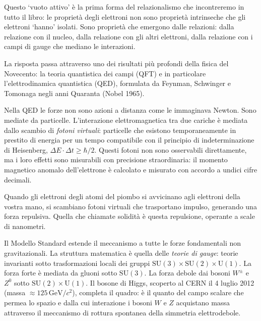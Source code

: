 \documentclass[12pt,a4paper,openany]{book}
\newcommand{\sezione}[1]{\vspace{1.2em}{\large\bfseries #1}\vspace{0.5em}\par}
\begin{document}
Questo `vuoto attivo' è la prima forma del relazionalismo che incontreremo in tutto il libro: le proprietà degli elettroni non sono proprietà intrinseche che gli elettroni `hanno' isolati. Sono proprietà che emergono dalle relazioni: dalla relazione con il nucleo, dalla relazione con gli altri elettroni, dalla relazione con i campi di gauge che mediano le interazioni.

\sezione{Il meccanismo della solidità: forze di gauge e fotoni virtuali}

La risposta passa attraverso uno dei risultati più profondi della fisica del Novecento: la teoria quantistica dei campi (QFT) e in particolare l'elettrodinamica quantistica (QED), formulata da Feynman, Schwinger e Tomonaga negli anni Quaranta (Nobel 1965).

Nella QED le forze non sono azioni a distanza come le immaginava Newton. Sono mediate da particelle. L'interazione elettromagnetica tra due cariche è mediata dallo scambio di \textit{fotoni virtuali}: particelle che esistono temporaneamente in prestito di energia per un tempo compatibile con il principio di indeterminazione di Heisenberg, $\Delta E \cdot \Delta t \geq \hbar/2$. Questi fotoni non sono osservabili direttamente, ma i loro effetti sono misurabili con precisione straordinaria: il momento magnetico anomalo dell'elettrone è calcolato e misurato con accordo a undici cifre decimali.

Quando gli elettroni degli atomi del piombo si avvicinano agli elettroni della vostra mano, si scambiano fotoni virtuali che trasportano impulso, generando una forza repulsiva. Quella che chiamate solidità è questa repulsione, operante a scale di nanometri.

Il Modello Standard estende il meccanismo a tutte le forze fondamentali non gravitazionali. La struttura matematica è quella delle \textit{teorie di gauge}: teorie invarianti sotto trasformazioni locali dei gruppi $\mathrm{SU}(3) \times \mathrm{SU}(2) \times \mathrm{U}(1)$. La forza forte è mediata da gluoni sotto $\mathrm{SU}(3)$. La forza debole dai bosoni $W^\pm$ e $Z^0$ sotto $\mathrm{SU}(2) \times \mathrm{U}(1)$. Il bosone di Higgs, scoperto al CERN il 4 luglio 2012 (massa $\approx 125\,\mathrm{GeV}/c^2$), completa il quadro: è il quanto del campo scalare che permea lo spazio e dalla cui interazione i bosoni $W$ e $Z$ acquistano massa attraverso il meccanismo di rottura spontanea della simmetria elettrodebole.

\sezione{Il principio di esclusione di Pauli e la pressione quantistica}
\end{document}
